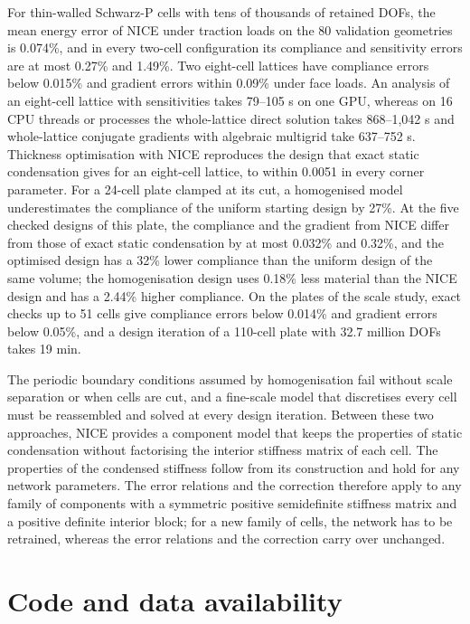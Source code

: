 \documentclass[preprint,12pt,authoryear]{elsarticle}
\begin{document}
For thin-walled Schwarz-P cells with tens of thousands of retained DOFs, the mean energy error of NICE under traction loads on the 80 validation geometries is 0.074\%, and in every two-cell configuration its compliance and sensitivity errors are at most 0.27\% and 1.49\%. Two eight-cell lattices have compliance errors below 0.015\% and gradient errors within 0.09\% under face loads. An analysis of an eight-cell lattice with sensitivities takes 79--105 s on one GPU, whereas on 16 CPU threads or processes the whole-lattice direct solution takes 868--1,042 s and whole-lattice conjugate gradients with algebraic multigrid take 637--752 s. Thickness optimisation with NICE reproduces the design that exact static condensation gives for an eight-cell lattice, to within 0.0051 in every corner parameter. For a 24-cell plate clamped at its cut, a homogenised model underestimates the compliance of the uniform starting design by 27\%. At the five checked designs of this plate, the compliance and the gradient from NICE differ from those of exact static condensation by at most 0.032\% and 0.32\%, and the optimised design has a 32\% lower compliance than the uniform design of the same volume; the homogenisation design uses 0.18\% less material than the NICE design and has a 2.44\% higher compliance. On the plates of the scale study, exact checks up to 51 cells give compliance errors below 0.014\% and gradient errors below 0.05\%, and a design iteration of a 110-cell plate with 32.7 million DOFs takes 19 min.

The periodic boundary conditions assumed by homogenisation fail without scale separation or when cells are cut, and a fine-scale model that discretises every cell must be reassembled and solved at every design iteration. Between these two approaches, NICE provides a component model that keeps the properties of static condensation without factorising the interior stiffness matrix of each cell. The properties of the condensed stiffness follow from its construction and hold for any network parameters. The error relations and the correction therefore apply to any family of components with a symmetric positive semidefinite stiffness matrix and a positive definite interior block; for a new family of cells, the network has to be retrained, whereas the error relations and the correction carry over unchanged.

\section*{Code and data availability}
\end{document}
